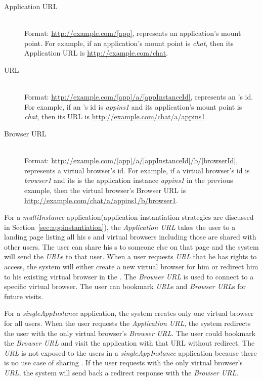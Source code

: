 \begin{description}

\item[Application URL] \label{itm:appurl} \hfill \\
Format: \url{http://example.com/[app]}, \code{[app]} represents an
application's mount point.   For example, if an application's mount point is
\emph{chat},  then its Application URL is \url{http://example.com/chat}.


\item[\appins{} URL] \label{itm:appinsurl} \hfill \\
Format: \url{http://example.com/[app]/a/[appInstanceId]},
\code{[appInstanceId]} represents an \appins{}'s id.  For example, if an
\appins{}'s id is \emph{appins1} and its application's mount point is
\emph{chat}, then its \appins{} URL is
\url{http://example.com/chat/a/appins1}.


\item[Browser URL] \label{itm:vburl} \hfill \\
Format: \url{http://example.com/[app]/a/[appInstanceId]/b/[browserId]},
\code{[browserId]} represents a virtual browser's id. For example, if a
virtual browser's id is \emph{browser1} and its \appins{} is the application
instance \emph{appins1} in the previous example, then the virtual browser's
Browser URL is \url{http://example.com/chat/a/appins1/b/browser1}.

\end{description}

For a \emph{multiInstance} application(application instantiation strategies
are discussed in Section~\ref{sec:appinstantiation}), the \emph{Application
URL} takes the user to a landing page listing all his \appins{}s and virtual
browsers including those are shared with other users. The user can share his
\appins{}s to someone else on that page and the system will send the
\emph{\appins{} URL}s to that user. When a user requests \emph{\appins{} URL}
that he has rights to access, the system will either create a new virtual
browser for him or redirect him to his existing virtual browser in the
\appins{}. The \emph{Browser URL} is used to connect to a specific virtual
browser. The user can bookmark \emph{\appins{} URL}s and \emph{Browser URL}s
for future visits.

For a \emph{singleAppInstance} application, the system
creates only one virtual browser for all users. When the user requests the
\emph{Application URL}, the system redirects the user with the only virtual
browser's \emph{Browser URL}. The user could bookmark the \emph{Browser URL}
and visit the application with that URL without redirect. The \emph{\appins
URL} is not exposed to the users in a \emph{singleAppInstance} application
because there is no use case of sharing \appins. If the user requests with the
only virtual browser's \emph{\appins URL}, the system will send back a
redirect response with the \emph{Browser URL}.



